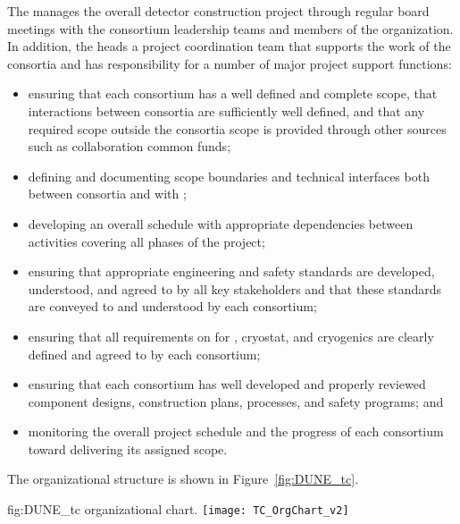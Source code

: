 The  manages the overall detector construction project
through regular board meetings with the consortium leadership teams 
and members of the  organization.  
%
In addition, the  heads %
a project coordination team that supports the work of 
the consortia and has responsibility for a number of major project 
support functions: 
\begin{itemize}
\item ensuring that each consortium has a well defined and complete
  scope, that interactions between consortia are sufficiently 
  well defined, and that any required scope outside the 
  consortia scope is provided through other sources such as collaboration
  common funds;
\item defining and documenting scope boundaries and technical 
  interfaces both between consortia and with ;  
\item developing an overall schedule with appropriate dependencies
  between activities covering all phases of the project;  
\item ensuring that appropriate engineering and safety standards 
  are developed, understood, and agreed to by all key stakeholders 
  and that these standards are conveyed to and understood by each
  consortium;
\item ensuring that all  requirements on  
  for , cryostat, and cryogenics are clearly defined and 
  agreed to by each consortium;
\item ensuring that each consortium has well developed and properly reviewed
  component designs, construction plans,  processes, and 
  safety programs; and
\item monitoring the overall project schedule and the progress of 
  each consortium toward delivering its assigned scope. 
\end{itemize}

The   organizational structure is shown 
in Figure~\ref{fig:DUNE_tc}.  

\begin{dunefigure}{fig:DUNE_tc}
  {  organizational chart.}
  \texttt{[image: TC\_OrgChart\_v2]}
\end{dunefigure}


